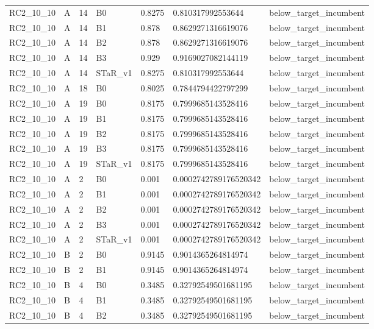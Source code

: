 \begin{tabular}{lllllll}
 RC2\_10\_10 & A & 14 & B0 & 0.8275 & 0.810317992553644 & below\_target\_incumbent \\
 RC2\_10\_10 & A & 14 & B1 & 0.878 & 0.8629271316619076 & below\_target\_incumbent \\
 RC2\_10\_10 & A & 14 & B2 & 0.878 & 0.8629271316619076 & below\_target\_incumbent \\
 RC2\_10\_10 & A & 14 & B3 & 0.929 & 0.9169027082144119 & below\_target\_incumbent \\
 RC2\_10\_10 & A & 14 & STaR\_v1 & 0.8275 & 0.810317992553644 & below\_target\_incumbent \\
 RC2\_10\_10 & A & 18 & B0 & 0.8025 & 0.7844794422797299 & below\_target\_incumbent \\
 RC2\_10\_10 & A & 19 & B0 & 0.8175 & 0.7999685143528416 & below\_target\_incumbent \\
 RC2\_10\_10 & A & 19 & B1 & 0.8175 & 0.7999685143528416 & below\_target\_incumbent \\
 RC2\_10\_10 & A & 19 & B2 & 0.8175 & 0.7999685143528416 & below\_target\_incumbent \\
 RC2\_10\_10 & A & 19 & B3 & 0.8175 & 0.7999685143528416 & below\_target\_incumbent \\
 RC2\_10\_10 & A & 19 & STaR\_v1 & 0.8175 & 0.7999685143528416 & below\_target\_incumbent \\
 RC2\_10\_10 & A & 2 & B0 & 0.001 & 0.0002742789176520342 & below\_target\_incumbent \\
 RC2\_10\_10 & A & 2 & B1 & 0.001 & 0.0002742789176520342 & below\_target\_incumbent \\
 RC2\_10\_10 & A & 2 & B2 & 0.001 & 0.0002742789176520342 & below\_target\_incumbent \\
 RC2\_10\_10 & A & 2 & B3 & 0.001 & 0.0002742789176520342 & below\_target\_incumbent \\
 RC2\_10\_10 & A & 2 & STaR\_v1 & 0.001 & 0.0002742789176520342 & below\_target\_incumbent \\
 RC2\_10\_10 & B & 2 & B0 & 0.9145 & 0.9014365264814974 & below\_target\_incumbent \\
 RC2\_10\_10 & B & 2 & B1 & 0.9145 & 0.9014365264814974 & below\_target\_incumbent \\
 RC2\_10\_10 & B & 4 & B0 & 0.3485 & 0.32792549501681195 & below\_target\_incumbent \\
 RC2\_10\_10 & B & 4 & B1 & 0.3485 & 0.32792549501681195 & below\_target\_incumbent \\
 RC2\_10\_10 & B & 4 & B2 & 0.3485 & 0.32792549501681195 & below\_target\_incumbent \\

\end{tabular}
